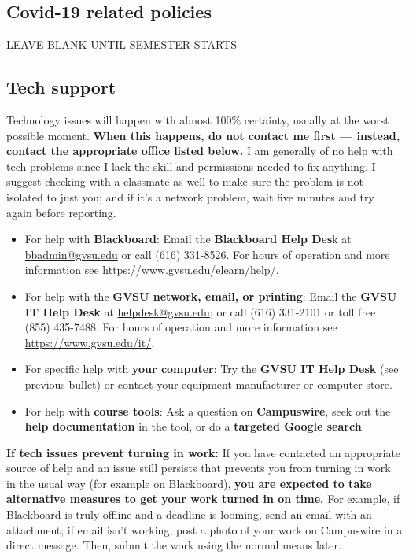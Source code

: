 \documentclass[]{article}
\providecommand{\tightlist}{%
  \setlength{\itemsep}{0pt}\setlength{\parskip}{0pt}}
\begin{document}
\subsection{Covid-19 related policies}

LEAVE BLANK UNTIL SEMESTER STARTS

\subsection{Tech support}

Technology issues will happen with almost 100\% certainty, usually at the worst possible moment. \textbf{When this happens, do not contact me first --- instead, contact the appropriate office listed below.} I am generally of no help with tech problems since I lack the skill and permissions needed to fix anything. I suggest checking with a classmate as well to make sure the problem is not isolated to just you; and if it's a network problem, wait five minutes and try again before reporting. 


\begin{tcolorbox}[colback=yellow!15!white]
\begin{itemize}
\tightlist
    \item For help with \textbf{Blackboard}: Email the \textbf{Blackboard Help Des}k at \url{bbadmin@gvsu.edu} or call (616) 331-8526. For hours of operation and more information see \url{https://www.gvsu.edu/elearn/help/}.
    \item For help with the \textbf{GVSU network, email, or printing}: Email the \textbf{GVSU IT Help Desk} at \url{helpdesk@gvsu.edu}; or call (616) 331-2101 or toll free (855) 435-7488. For hours of operation and more information see \url{https://www.gvsu.edu/it/}.
    \item For specific help with \textbf{your computer}: Try the \textbf{GVSU IT Help Desk} (see previous bullet) or contact your equipment manufacturer or computer store.
    \item For help with \textbf{course tools}: Ask a question on \textbf{Campuswire}, seek out the \textbf{help documentation} in the tool, or do a \textbf{targeted Google search}.
\end{itemize}
\end{tcolorbox}

\textbf{If tech issues prevent turning in work:} If you have contacted an appropriate source of help and an issue still persists that prevents you from turning in work in the usual way (for example on Blackboard), \textbf{you are expected to take alternative measures to get your work turned in on time.} For example, if Blackboard is truly offline and a deadline is looming, send an email with an attachment; if email isn't working, post a photo of your work on Campuswire in a direct message. Then, submit the work using the normal means later. 
\end{document}
